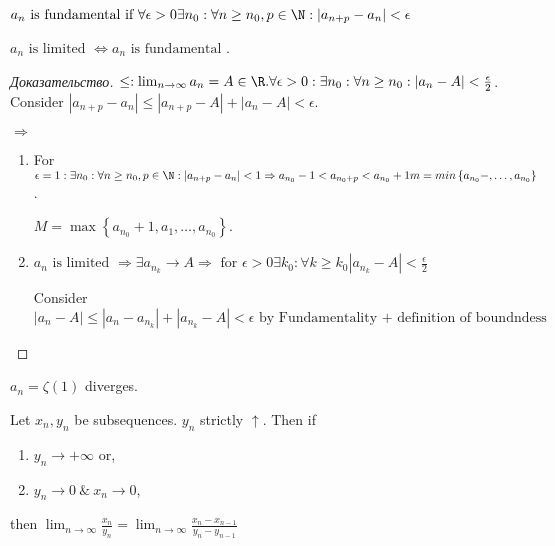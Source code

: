 \begin{theorem}[]
	$a_n \text{ is fundamental if } \forall \epsilon > 0 \exists n_0: \forall n \geq n_0, p \in \N: \left| a_{n + p} - a_n \right| < \epsilon$

	$a_n \text{ is limited } \Leftrightarrow a_n \text{ is fundamental } $.
\end{theorem}
\begin{proof}[Доказательство]
	$ \leq  : \lim_{n \to \infty} a_n = A \in \R. \forall \epsilon > 0: \exists n_0: \forall n \geq n_0: \left| a_n - A \right| < \frac{\epsilon}{2}$. Consider $\left| a_{n+p} - a_n \right| \leq \left| a_{n+p} - A \right| + \left| a_n - A \right|  < \epsilon $.

	$ \Rightarrow $
	\begin{enumerate}
		\item For $\epsilon = 1: \exists n_0: \forall n \geq n_0, p \in \N: \left| a_{n+p} - a_n \right| < 1 \Rightarrow a_{n_0} - 1 < a_{n_0 + p} < a_{n_0} + 1 \\ m = min \left\{ a_{n_0} - , \dots, a_{n_0} \right \} $.

			$M = \max \left\{ a_{n_0} + 1, a_1, \dots , a_{n_0} \right \} $.
		\item $a_n \text{ is limited } \Rightarrow \exists a_{n_k} \to A \Rightarrow \text{ for } \epsilon > 0 \exists k_0: \forall k \geq k_0 \left| a_{n_k} - A \right| < \frac{\epsilon}{2} $

			Consider $\left| a_{n} - A \right| \leq \left| a_{n} - a_{n_k} \right| + \left| a_{n_k} - A \right| < \epsilon \text{ by Fundamentality + definition of boundndess }$
	\end{enumerate}
\end{proof}

\begin{example}[]
	$a_n = \zeta(1)$ diverges.
\end{example}

\begin{theorem}[Stolz]
	Let $x_n, y_n$ be subsequences. $y_n $ strictly  $\uparrow$. Then if \begin{enumerate}
		\item $y_n \to +\infty$ or,
		\item $y_n \to 0 \ \& \ x_n \to 0$, 
	\end{enumerate} then $\lim_{n \to \infty} \frac{x_n}{y_n} = \lim_{n \to \infty} \frac{x_n - x_{n-1}}{y_n - y_{n-1}}$
\end{theorem}

